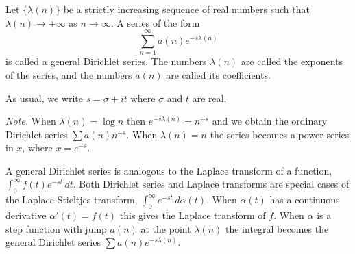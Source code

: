 Let $\{\lambda(n)\}$ be a strictly increasing sequence of real numbers such that $\lambda(n) \to +\infty$ as $n \to \infty$. A series of the form
$$\sum_{n=1}^{\infty} a(n)e^{-s\lambda(n)}$$
is called a general Dirichlet series. The numbers $\lambda(n)$ are called the exponents of the series, and the numbers $a(n)$ are called its coefficients.

As usual, we write $s = \sigma + it$ where $\sigma$ and $t$ are real.

\textit{Note.} When $\lambda(n) = \log n$ then $e^{-s\lambda(n)} = n^{-s}$ and we obtain the ordinary Dirichlet series $\sum a(n)n^{-s}$. When $\lambda(n) = n$ the series becomes a power series in $x$, where $x = e^{-s}$.

A general Dirichlet series is analogous to the Laplace transform of a function, $\int_0^\infty f(t)e^{-st}\,dt$. Both Dirichlet series and Laplace transforms are special cases of the Laplace-Stieltjes transform, $\int_0^\infty e^{-st}\,d\alpha(t)$. When $\alpha(t)$ has a continuous derivative $\alpha'(t) = f(t)$ this gives the Laplace transform of $f$. When $\alpha$ is a step function with jump $a(n)$ at the point $\lambda(n)$ the integral becomes the general Dirichlet series $\sum a(n)e^{-s\lambda(n)}$.
